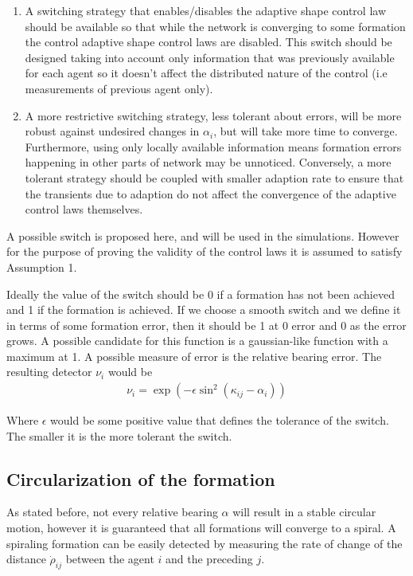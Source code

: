 \begin{enumerate}
	\item A switching strategy that enables/disables the adaptive shape control law should be available so that while the network is converging to some formation the control adaptive shape control laws are disabled. This switch should be designed taking into account only information that was previously available for each agent so it doesn't affect the distributed nature of the control (i.e measurements of previous agent only).
	
	\item A more restrictive switching strategy, less tolerant about errors, will be more robust against undesired changes in $\alpha_i$, but will take more time to converge. Furthermore, using only locally available information means formation errors happening in other parts of network may be unnoticed. Conversely, a more tolerant strategy should be coupled with smaller adaption rate to ensure that the transients due to adaption do not affect the convergence of the adaptive control laws themselves. 
\end{enumerate}

A possible switch is proposed here, and will be used in the simulations. However for the purpose of proving the validity of the control laws it is assumed to satisfy Assumption 1.

Ideally the value of the switch should be 0 if a formation has not been achieved and 1 if the formation is achieved. If we choose a smooth switch and we define it in terms of some formation error, then it should be 1 at 0 error and 0 as the error grows. A possible candidate for this function is a gaussian-like function with a maximum at 1. A possible measure of error is the relative bearing error. The resulting detector $\nu_{i}$ would be
\begin{gather}
\label{switch}
\nu_{i} = \exp(-\epsilon \sin^2(\kappa_{ij} -\alpha_i))
\end{gather}

Where $\epsilon$ would be some positive value that defines the tolerance of the switch. The smaller it is the more tolerant the switch.

\subsection{Circularization of the formation}
As stated before, not every relative bearing $\alpha$ will result in a stable circular motion, however it is guaranteed that all formations will converge to a spiral. A spiraling formation can be easily detected by measuring the rate of change of the distance $\dot{\rho}_{ij}$ between the agent $i$ and the preceding $j$.

